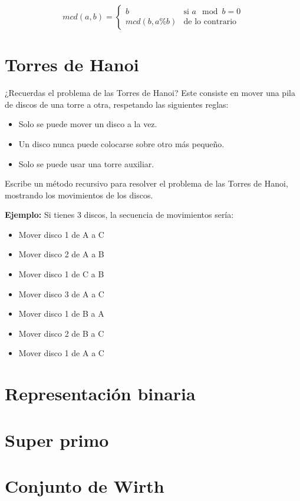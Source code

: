\[ mcd(a, b) = \begin{cases}
b & \text{si } a \mod b = 0 \\
mcd(b, a \% b) & \text{de lo contrario}
\end{cases} \]

\section{Torres de Hanoi}
¿Recuerdas el problema de las Torres de Hanoi? Este consiste en mover una pila de discos de una torre a otra, respetando las siguientes reglas:
\begin{itemize}
    \item Solo se puede mover un disco a la vez.
    \item Un disco nunca puede colocarse sobre otro más pequeño.
    \item Solo se puede usar una torre auxiliar.
\end{itemize}

Escribe un método recursivo para resolver el problema de las Torres de Hanoi, mostrando los movimientos de los discos.

\textbf{Ejemplo:}
Si tienes 3 discos, la secuencia de movimientos sería:
\begin{itemize}
    \item Mover disco 1 de A a C
    \item Mover disco 2 de A a B
    \item Mover disco 1 de C a B
    \item Mover disco 3 de A a C
    \item Mover disco 1 de B a A
    \item Mover disco 2 de B a C
    \item Mover disco 1 de A a C
\end{itemize}

\section{Representación binaria}


\section{Super primo}


\section{Conjunto de Wirth}


